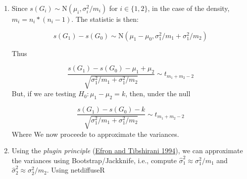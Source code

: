 \documentclass[
]{book}
\newenvironment{Shaded}{\begin{snugshade}}{\end{snugshade}}
\newcommand{\AttributeTok}[1]{\textcolor[rgb]{0.13,0.29,0.53}{#1}}
\newcommand{\CommentTok}[1]{\textcolor[rgb]{0.56,0.35,0.01}{\textit{#1}}}
\newcommand{\ControlFlowTok}[1]{\textcolor[rgb]{0.13,0.29,0.53}{\textbf{#1}}}
\newcommand{\DecValTok}[1]{\textcolor[rgb]{0.00,0.00,0.81}{#1}}
\newcommand{\FunctionTok}[1]{\textcolor[rgb]{0.13,0.29,0.53}{\textbf{#1}}}
\newcommand{\NormalTok}[1]{#1}
\newcommand{\OtherTok}[1]{\textcolor[rgb]{0.56,0.35,0.01}{#1}}
\newcommand{\SpecialCharTok}[1]{\textcolor[rgb]{0.81,0.36,0.00}{\textbf{#1}}}
\begin{document}
\begin{enumerate}
\def\labelenumi{\arabic{enumi}.}
\item
  Since \(s(G_i)\sim \mbox{N}(\mu_i,\sigma_i^2/m_i)\) for \(i\in\{1,2\}\), in the case
  of the density, \(m_i = n_i * (n_i - 1)\). The statistic is then:

  \[
  s(G_1) - s(G_0)\sim \mbox{N}(\mu_1-\mu_0, \sigma_1^2/m_1 + \sigma_1^2/m_2)
  \]

  Thus

  \[
  \frac{s(G_1) - s(G_0) - \mu_1 + \mu_2}{\sqrt{\sigma_1^2/{m_1} + \sigma_1^2/{m_2}}} \sim t_{m_1 + m_2 - 2}
  \]
  But, if we are testing \(H_0: \mu_1 - \mu_2 = k\), then, under the null

  \[
  \frac{s(G_1) - s(G_0) - k}{\sqrt{\sigma_1^2/{m_1} + \sigma_1^2/{m_2}}} \sim t_{m_1 + m_2 - 2}
  \]
  Where We now proceede to approximate the variances.
\item
  Using the \emph{plugin principle} (\protect\hyperlink{ref-Efron1994}{Efron and Tibshirani 1994}), we can approximate the variances
  using Bootstrap/Jackknife, i.e., compute \(\hat\sigma_1^2\approx\sigma_1^2/m_1\) and
  \(\hat\sigma_2^2\approx\sigma_2^2/m_2\). Using netdiffuseR

\begin{Shaded}
\end{Shaded}
\end{enumerate}
\end{document}
